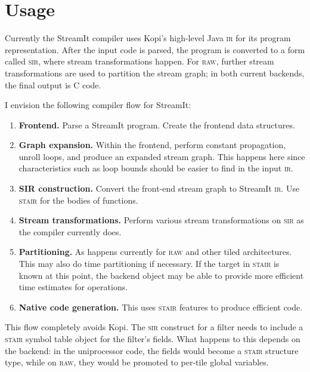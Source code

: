 \documentclass[11pt]{article}
\def\ir{\textsc{ir}}
\def\raw{\textsc{raw}}
\def\sir{\textsc{sir}}
\def\stair{\textsc{stair}}
\begin{document}
\section{Usage}

Currently the StreamIt compiler uses Kopi's high-level Java \ir{} for
its program representation.  After the input code is parsed, the
program is converted to a form called \sir{}, where stream
transformations happen.  For \raw{}, further stream transformations
are used to partition the stream graph; in both current backends, the
final output is C code.

I envision the following compiler flow for StreamIt:

\begin{enumerate}
\item \textbf{Frontend.}  Parse a StreamIt program.  Create the
  frontend data structures.
\item \textbf{Graph expansion.}  Within the frontend, perform constant
  propagation, unroll loops, and produce an expanded stream graph.
  This happens here since characteristics such as loop bounds should
  be easier to find in the input \ir.
\item \textbf{SIR construction.}  Convert the front-end stream graph
  to StreamIt \ir.  Use \stair{} for the bodies of functions.
\item \textbf{Stream transformations.}  Perform various stream
  transformations on \sir{} as the compiler currently does.
\item \textbf{Partitioning.}  As happens currently for \raw{} and
  other tiled architectures.  This may also do time partitioning if
  necessary.  If the target in \stair{} is known at this point, the
  backend object may be able to provide more efficient time estimates
  for operations.
\item \textbf{Native code generation.}  This uses \stair{} features to
  produce efficient code.
\end{enumerate}

This flow completely avoids Kopi.  The \sir{} construct for a filter
needs to include a \stair{} symbol table object for the filter's
fields.  What happens to this depends on the backend: in the
uniprocessor code, the fields would become a \stair{} structure type,
while on \raw{}, they would be promoted to per-tile global variables.



\end{document}
